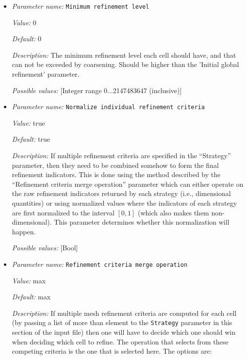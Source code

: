 \begin{itemize}
{\it Description:} The number of global refinement steps performed on the initial coarse mesh, before the problem is first solved there.


{\it Possible values:} [Integer range 0...2147483647 (inclusive)]
\item {\it Parameter name:} {\tt Minimum refinement level}


{\it Value:} 0


{\it Default:} 0


{\it Description:} The minimum refinement level each cell should have, and that can not be exceeded by coarsening. Should be higher than the 'Initial global refinement' parameter.


{\it Possible values:} [Integer range 0...2147483647 (inclusive)]
\item {\it Parameter name:} {\tt Normalize individual refinement criteria}


{\it Value:} true


{\it Default:} true


{\it Description:} If multiple refinement criteria are specified in the ``Strategy'' parameter, then they need to be combined somehow to form the final refinement indicators. This is done using the method described by the ``Refinement criteria merge operation'' parameter which can either operate on the raw refinement indicators returned by each strategy (i.e., dimensional quantities) or using normalized values where the indicators of each strategy are first normalized to the interval $[0,1]$ (which also makes them non-dimensional). This parameter determines whether this normalization will happen.


{\it Possible values:} [Bool]
\item {\it Parameter name:} {\tt Refinement criteria merge operation}


{\it Value:} max


{\it Default:} max


{\it Description:} If multiple mesh refinement criteria are computed for each cell (by passing a list of more than element to the \texttt{Strategy} parameter in this section of the input file) then one will have to decide which one should win when deciding which cell to refine. The operation that selects from these competing criteria is the one that is selected here. The options are:


\end{itemize}
